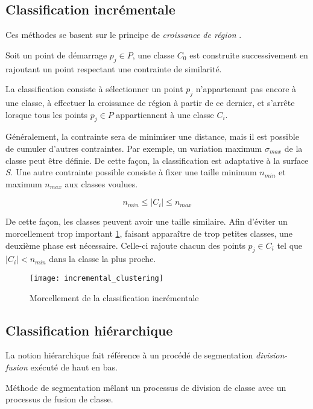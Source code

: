 \subsection{Classification incrémentale}
Ces méthodes se basent sur le principe de \emph{croissance de région} .

\begin{definition}
  Soit un point de démarrage $p_j \in P$, une classe $C_0$ est construite successivement en rajoutant un point respectant une contrainte de similarité.
\end{definition}

La classification consiste à sélectionner un point $p_j$ n'appartenant pas encore à une classe, à effectuer la croissance de région à partir de ce dernier, et s'arrête lorsque tous les points $p_j \in P$ appartiennent à une classe $C_i$.

Généralement, la contrainte sera de minimiser une distance, mais il est possible de cumuler d'autres contraintes. Par exemple, un variation maximum $\sigma_{max}$ de la classe peut être définie. De cette façon, la classification est adaptative à la surface $S$. Une autre contrainte possible consiste à fixer une taille minimum $n_{min}$ et maximum $n_{max}$ aux classes voulues.

$$n_{min} \le |C_i| \le n_{max}$$

De cette façon, les classes peuvent avoir une taille similaire. Afin d'éviter un morcellement trop important \ref{fig:sampling_incremental_fragmentation}, faisant apparaître de trop petites classes, une deuxième phase est nécessaire. Celle-ci rajoute chacun des points $p_j \in C_i$ tel que $|C_i| < n_{min}$ dans la classe la plus proche.

\begin{figure}
  \centering
  \texttt{[image: incremental\_clustering]}
  \caption{Morcellement de la classification incrémentale~\cite{Pauly2002}}
  \label{fig:sampling_incremental_fragmentation}
\end{figure}

\subsection{Classification hiérarchique}

La notion hiérarchique fait référence à un procédé de segmentation \emph{division-fusion} exécuté de haut en bas.

\begin{definition}
  Méthode de segmentation mêlant un processus de division de classe avec un processus de fusion de classe.
\end{definition}

